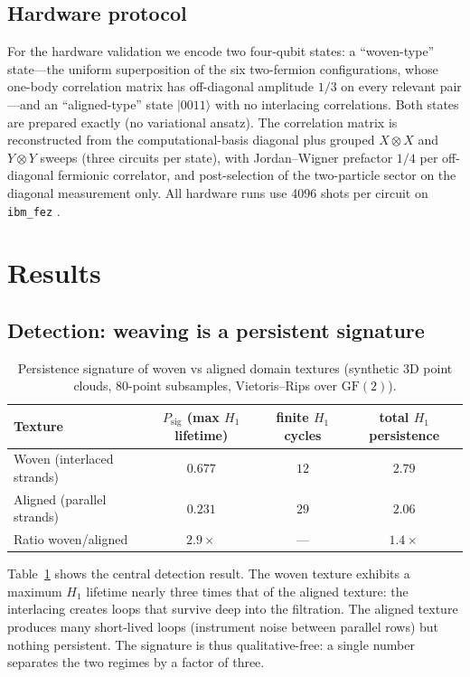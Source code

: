\documentclass[11pt]{article}
\begin{document}
\subsection{Hardware protocol}

For the hardware validation we encode two four-qubit states: a
``woven-type'' state---the uniform superposition of the six two-fermion
configurations, whose one-body correlation matrix has off-diagonal
amplitude $1/3$ on every relevant pair---and an ``aligned-type'' state
$|0011\rangle$ with no interlacing correlations. Both states are prepared
exactly (no variational ansatz). The correlation matrix is reconstructed
from the computational-basis diagonal plus grouped $X\!\otimes\!X$ and
$Y\!\otimes\!Y$ sweeps (three circuits per state), with Jordan--Wigner
prefactor $1/4$ per off-diagonal fermionic correlator, and post-selection of
the two-particle sector on the diagonal measurement only. All hardware runs
use 4096 shots per circuit on \texttt{ibm\_fez} \cite{IBM}.

\section{Results}
\label{sec:results}

\subsection{Detection: weaving is a persistent signature}

\begin{table}[t]
\centering
\caption{Persistence signature of woven vs aligned domain textures
(synthetic 3D point clouds, 80-point subsamples, Vietoris--Rips over
$\mathrm{GF}(2)$).}
\label{tab:detection}
\begin{tabular}{lccc}
\toprule
Texture & $P_{\mathrm{sig}}$ (max $H_1$ lifetime) & finite $H_1$ cycles &
total $H_1$ persistence\\
\midrule
Woven (interlaced strands) & $0.677$ & $12$ & $2.79$\\
Aligned (parallel strands) & $0.231$ & $29$ & $2.06$\\
\midrule
Ratio woven/aligned & $2.9\times$ & --- & $1.4\times$\\
\bottomrule
\end{tabular}
\end{table}

Table~\ref{tab:detection} shows the central detection result. The woven
texture exhibits a maximum $H_1$ lifetime nearly three times that of the
aligned texture: the interlacing creates loops that survive deep into the
filtration. The aligned texture produces many short-lived loops (instrument
noise between parallel rows) but nothing persistent. The signature is thus
qualitative-free: a single number separates the two regimes by a factor of
three.
\end{document}
